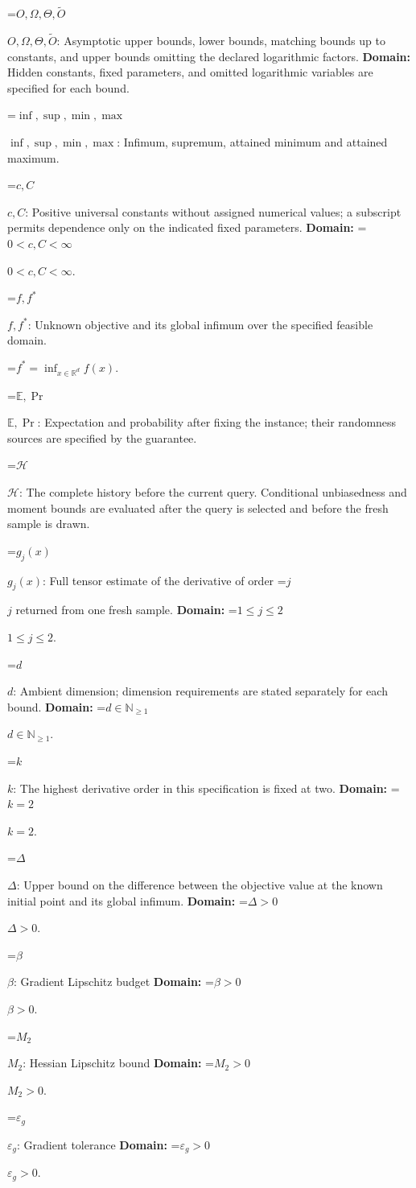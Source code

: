 \documentclass[10pt,a4paper]{article}
\newcommand{\AtlasMath}[1]{\par\begingroup\centering\setbox0=\hbox{$\displaystyle #1$}\ifdim\wd0>1.4\linewidth\typeout{ATLAS WIDE FORMULA: \the\wd0}\fi\ifdim\wd0>\linewidth\resizebox{\linewidth}{!}{\box0}\else\box0\fi\par\endgroup}
\newcommand{\AtlasInlineMath}[1]{\begingroup\setbox0=\hbox{$#1$}\ifdim\wd0>.4\linewidth\endgroup\AtlasMath{#1}\else\endgroup$#1$\fi}
\begin{document}
\AtlasInlineMath{O,\Omega,\Theta,\widetilde{O}}: Asymptotic upper bounds, lower bounds, matching bounds up to constants, and upper bounds omitting the declared logarithmic factors. \textbf{Domain:} Hidden constants, fixed parameters, and omitted logarithmic variables are specified for each bound.

\AtlasInlineMath{\inf,\sup,\min,\max}: Infimum, supremum, attained minimum and attained maximum.

\AtlasInlineMath{c,C}: Positive universal constants without assigned numerical values; a subscript permits dependence only on the indicated fixed parameters. \textbf{Domain:} \AtlasInlineMath{0<c,C<\infty}.

\AtlasInlineMath{f,f^*}: Unknown objective and its global infimum over the specified feasible domain.


\AtlasMath{f^*=\inf_{x\in \mathbb{R}^d}f(x).}


\AtlasInlineMath{\mathbb{E},\Pr}: Expectation and probability after fixing the instance; their randomness sources are specified by the guarantee.

\AtlasInlineMath{\mathcal{H}}: The complete history before the current query. Conditional unbiasedness and moment bounds are evaluated after the query is selected and before the fresh sample is drawn.

\AtlasInlineMath{g_j(x)}: Full tensor estimate of the derivative of order \AtlasInlineMath{j} returned from one fresh sample. \textbf{Domain:} \AtlasInlineMath{1\le j\le 2}.

\AtlasInlineMath{d}: Ambient dimension; dimension requirements are stated separately for each bound. \textbf{Domain:} \AtlasInlineMath{d\in\mathbb{N}_{\ge 1}}.

\AtlasInlineMath{k}: The highest derivative order in this specification is fixed at two. \textbf{Domain:} \AtlasInlineMath{k=2}.

\AtlasInlineMath{\Delta}: Upper bound on the difference between the objective value at the known initial point and its global infimum. \textbf{Domain:} \AtlasInlineMath{\Delta>0}.

\AtlasInlineMath{\beta}: Gradient Lipschitz budget \textbf{Domain:} \AtlasInlineMath{\beta>0}.

\AtlasInlineMath{M_2}: Hessian Lipschitz bound \textbf{Domain:} \AtlasInlineMath{M_2>0}.

\AtlasInlineMath{\varepsilon_g}: Gradient tolerance \textbf{Domain:} \AtlasInlineMath{\varepsilon_g>0}.
\end{document}
